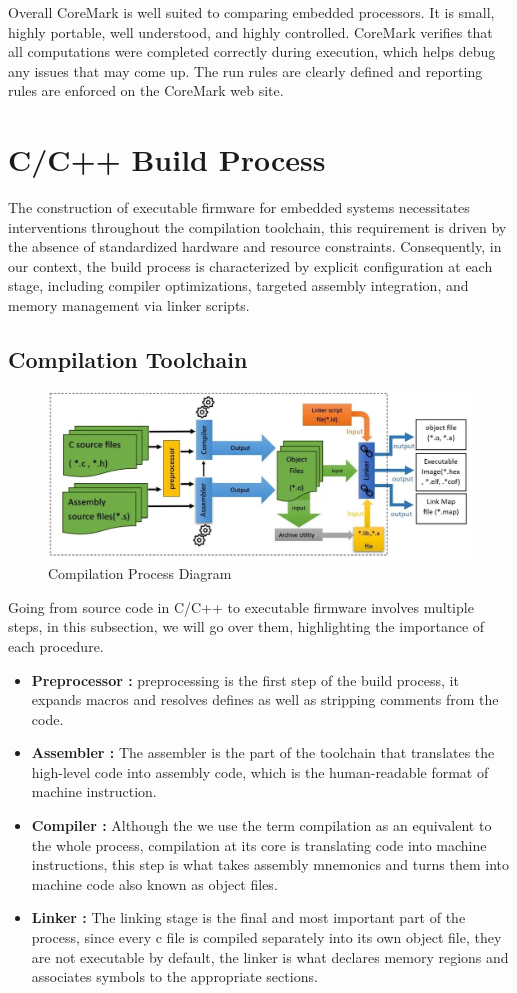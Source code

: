 Overall CoreMark is well suited to comparing embedded processors. It is small, highly
portable, well understood, and highly controlled. CoreMark verifies that all computations
were completed correctly during execution, which helps debug any issues that may come
up. The run rules are clearly defined and reporting rules are enforced on the CoreMark
web site.
\section{C/C++ Build Process}
The construction of executable firmware for embedded systems necessitates interventions throughout the compilation toolchain, this requirement is driven by the absence of standardized hardware and resource constraints. Consequently, in our context, the build process is characterized by explicit configuration at each stage, including compiler optimizations, targeted assembly integration, and memory management via linker scripts.
\subsection{Compilation Toolchain}
\begin{figure}[H]
  \centering
  \includegraphics[width=15cm]{img/comp_diag.jpeg}
  \caption{Compilation Process Diagram}
  \label{fig:compilation}
\end{figure}
Going from source code in C/C++ to executable firmware involves multiple steps, in this subsection, we will go over them, highlighting the importance of each procedure.
\begin{itemize}
    \item \textbf{Preprocessor :} preprocessing is the first step of the build process, it expands macros and resolves defines as well as stripping comments from the code.
    \item \textbf{Assembler :} The assembler is the part of the toolchain that translates the high-level code into assembly code, which is the human-readable format of machine instruction.
    \item \textbf{Compiler :} Although the we use the term compilation as an equivalent to the whole process, compilation at its core is translating code into machine instructions, this step is what takes assembly mnemonics and turns them into machine code also known as object files.
    \item \textbf{Linker :} The linking stage is the final and most important part of the process, since every c file is compiled separately into its own object file, they are not executable by default, the linker is what declares memory regions and associates symbols to the appropriate sections.
\end{itemize}
